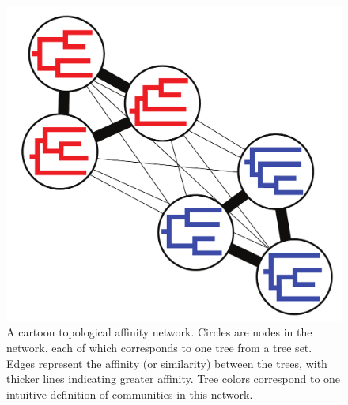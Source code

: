 \documentclass[11pt]{article}
\begin{document}
\begin{figure}[thbp!]\centering
\includegraphics[scale=0.25]{imagesForManual/Figure2.pdf}
\caption{A cartoon topological affinity network. Circles are nodes in the network, each of which corresponds to one tree from a tree set. Edges represent the affinity (or similarity) between the trees, with thicker lines indicating greater affinity. Tree colors correspond to one intuitive definition of communities in this network.}\label{fig2}
\end{figure}
\end{document}

